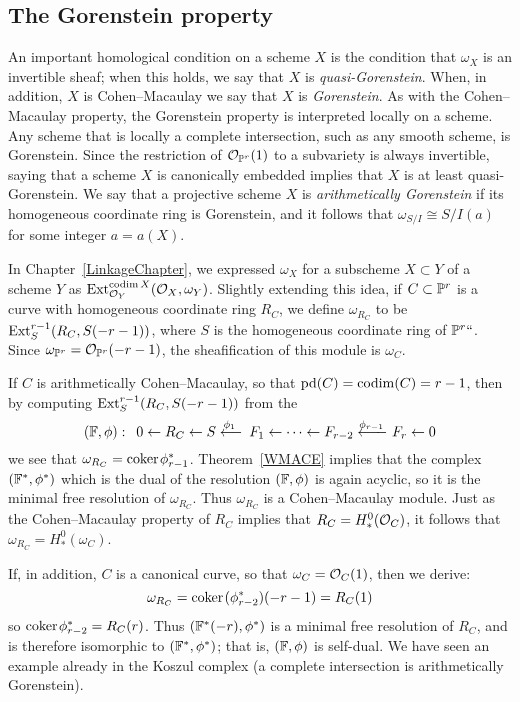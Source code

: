 \subsection*{The Gorenstein property}
An important homological condition on a scheme $X$ is the condition that
$\omega_X$ is an invertible sheaf; when this holds, we say that $X$
is \emph{quasi-Gorenstein}. When, in addition, $X$ is Cohen--Macaulay
%
%
we say that $X$ is \emph{Gorenstein}. As with the Cohen--Macaulay property,
the Gorenstein property is interpreted locally
on a scheme. 
Any scheme that is locally a
complete intersection, such as any smooth scheme, is Gorenstein. Since
the restriction
of ${\mathcal O}_{\mathbb P^r}(1)$ to a subvariety is always invertible, saying that
a scheme $X$ is canonically embedded implies that
$X$ is at least quasi-Gorenstein. We say that a projective scheme $X$ is
\emph{arithmetically Gorenstein}
%
if its homogeneous coordinate ring is Gorenstein, and it follows that
$\omega_{S/I} \cong S/I(a)$ for some integer $a = a(X)$.

In Chapter~\ref{LinkageChapter},  we expressed $\omega_X$
for a subscheme $X\subset Y$ of a scheme $Y$ as
${\rm{Ext}}^{\operatorname{codim} X}_{{\mathcal O}_Y}({\mathcal O}_X, \omega_Y)$. Slightly extending this idea,
if $C\subset \mathbb P^r$ is a curve
with homogeneous coordinate ring $R_{C}$,
we define $\omega_{R_C}$ to be ${\rm{Ext}}^{r-1}_S(R_C, S(-r-1))$, where $S$
is the homogeneous coordinate ring of $\mathbb P^r` `$.
Since $\omega_{\mathbb P^r} = {\mathcal O}_{\mathbb P^r}(-r-1)$, the sheafification of this
module is  $\omega_C$.

If $C$ is arithmetically Cohen--Macaulay, so that
$\operatorname{pd} (C) = \operatorname{codim}(C) = r-1$,  then by
computing ${\rm{Ext}}^{r-1}_S(R_C, S(-r-1))$ from the 
%
$$
(\FF, \phi):\quad 
0\leftarrow R_C \leftarrow S\luto{\phi_1} F_1 \leftarrow \cdots \leftarrow 
F_{r-2} \luto{\!\phi_{r-1}}\hskip-15pt-\ F_r\leftarrow 0
$$
we see that $\omega_{R_C} = {\rm{coker}\kern1pt} \phi_{r-1}^*$. 
%
Theorem~\ref{WMACE}
implies that the complex $({\mathbb F}^*, \phi^*)$ which is the dual
of the  resolution $({\mathbb F}, \phi)$ is again acyclic, so it is the minimal
free resolution of $\omega_{R_C}$. Thus
$\omega_{R_C}$ is a Cohen--Macaulay module. Just as the Cohen--Macaulay
property of
$R_C$ implies that $R_C = H^0_*({\mathcal O}_C)$, it follows that $\omega_{R_C}
= H^0_*(\omega_C)$.

If, in addition, $C$ is a canonical curve, so that $\omega_C = {\mathcal O}_C(1)$,
then we derive:
$$
\omega_{R_C} = {\rm{coker}\kern1pt}(\phi_{r-2}^*)(-r-1) = R_C(1)
$$
so ${\rm{coker}\kern1pt} \phi_{r-2}^* = R_C(r)$. Thus $({\mathbb F}^*(-r), \phi^*)$ is a
minimal free resolution of $R_C$, and is therefore isomorphic to
$({\mathbb F}^*, \phi^*)$; that is, $({\mathbb F}, \phi)$ is self-dual.
We have seen an example already
in the Koszul complex (a complete intersection is arithmetically Gorenstein).

